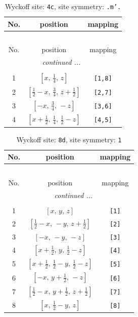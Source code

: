 \documentclass[fleqn,8pt]{jsarticle}
\begin{document}
\renewcommand{\arraystretch}{1.2}
\begin{longtable}{ccc}
\caption{Wyckoff site: {\tt 4c}, site symmetry: {\tt .m'.}}
 \\
 \hline \hline
No. & position & mapping \\ \hline \endfirsthead

\multicolumn{2}{l}{\tablename\ \thetable{}} \\
 \hline \hline
No. & position & mapping \\ \hline \endhead

 \hline \hline
\multicolumn{2}{r}{\footnotesize\it continued ...} \\ \endfoot

 \hline \hline
\multicolumn{2}{r}{} \\ \endlastfoot

1 & $\left[ x,\, \frac{1}{4},\, z \right]$ & {\tt [1,8]} \\ \hline
2 & $\left[ \frac{1}{2} - x,\, \frac{3}{4},\, z + \frac{1}{2} \right]$ & {\tt [2,7]} \\ \hline
3 & $\left[ - x,\, \frac{3}{4},\, - z \right]$ & {\tt [3,6]} \\ \hline
4 & $\left[ x + \frac{1}{2},\, \frac{1}{4},\, \frac{1}{2} - z \right]$ & {\tt [4,5]} \\
\end{longtable}
\renewcommand{\arraystretch}{1.2}
\begin{longtable}{ccc}
\caption{Wyckoff site: {\tt 8d}, site symmetry: {\tt 1}}
 \\
 \hline \hline
No. & position & mapping \\ \hline \endfirsthead

\multicolumn{2}{l}{\tablename\ \thetable{}} \\
 \hline \hline
No. & position & mapping \\ \hline \endhead

 \hline \hline
\multicolumn{2}{r}{\footnotesize\it continued ...} \\ \endfoot

 \hline \hline
\multicolumn{2}{r}{} \\ \endlastfoot

1 & $\left[ x,\, y,\, z \right]$ & {\tt [1]} \\ \hline
2 & $\left[ \frac{1}{2} - x,\, - y,\, z + \frac{1}{2} \right]$ & {\tt [2]} \\ \hline
3 & $\left[ - x,\, - y,\, - z \right]$ & {\tt [3]} \\ \hline
4 & $\left[ x + \frac{1}{2},\, y,\, \frac{1}{2} - z \right]$ & {\tt [4]} \\ \hline
5 & $\left[ x + \frac{1}{2},\, \frac{1}{2} - y,\, \frac{1}{2} - z \right]$ & {\tt [5]} \\ \hline
6 & $\left[ - x,\, y + \frac{1}{2},\, - z \right]$ & {\tt [6]} \\ \hline
7 & $\left[ \frac{1}{2} - x,\, y + \frac{1}{2},\, z + \frac{1}{2} \right]$ & {\tt [7]} \\ \hline
8 & $\left[ x,\, \frac{1}{2} - y,\, z \right]$ & {\tt [8]} \\
\end{longtable}
\end{document}
